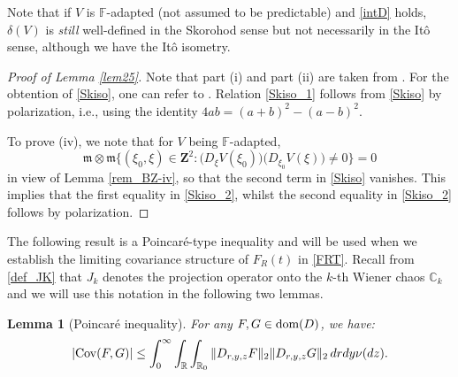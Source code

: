 \documentclass[letterpaper, 11pt,  reqno]{amsart}
\newtheorem{lemma}[theorem]{Lemma}
\newcommand{\C}{\mathbb{C}}
\newcommand{\bR}{\mathbb{R}}
\newcommand{\dl}{\delta}
\newcommand{\fm}{\mathfrak{m}}
\newcommand{\dom}{\textup{dom}}
\numberwithin{equation}{section}
\numberwithin{theorem}{section}
\begin{document}
Note that if $V$ is $\mathbb{F}$-adapted (not assumed to be  predictable) and   \eqref{intD} holds, 
$\dl(V)$ is {\it still} well-defined in the Skorohod sense
but not necessarily  in the It\^o sense, although we have the It\^o isometry.



 \begin{proof}[Proof of Lemma \ref{lem25}]
 Note that part (i) and part (ii) are taken from \cite[Lemma 2.5]{BZ23}.
 For the obtention of \eqref{Skiso}, one can refer to \cite[Theorem 5]{Last16}.
 Relation \eqref{Skiso_1} follows from \eqref{Skiso} by polarization, i.e.,
using the identity $4ab=(a+b)^2-(a-b)^2$.

To prove (iv), we note that for 
  $V$  being    $\mathbb{F}$-adapted, 
\[
\fm\otimes\fm\big\{ (\xi_0, \xi) \in\mathbf{Z}^2: 
 \big(  D_\xi V(\xi_0) \big)\big(  D_{\xi_0} V(\xi) \big)  \neq 0 \big\}
=0
\]
in view of Lemma \ref{rem_BZ-iv}, 
so that the second term in \eqref{Skiso} vanishes. 
This implies that  the first equality in  \eqref{Skiso_2},
whilst  the second equality in   \eqref{Skiso_2}
follows by polarization.
\qedhere







\end{proof}


The following result  is a Poincar\'e-type inequality
and  will be used when we establish the limiting covariance structure 
of $F_R(t)$ in \eqref{FRT}.
Recall from \eqref{def_JK} that $J_k$ denotes the projection operator onto the 
$k$-th Wiener chaos $\C_k$  and we will use this notation 
in the following two lemmas. 


 
 


\begin{lemma}[Poincar\'e inequality]
\label{2-Poincare}
For any $F,G \in \dom(D)$, we have:
\[
|{\rm Cov} (F,G)| \leq \int_0^{\infty}\int_{\bR}\int_{\bR_0}\|D_{r,y,z}F\|_2\|D_{r,y,z}G\|_2\, drdy \nu(dz).
\]
\end{lemma}
\end{document}
